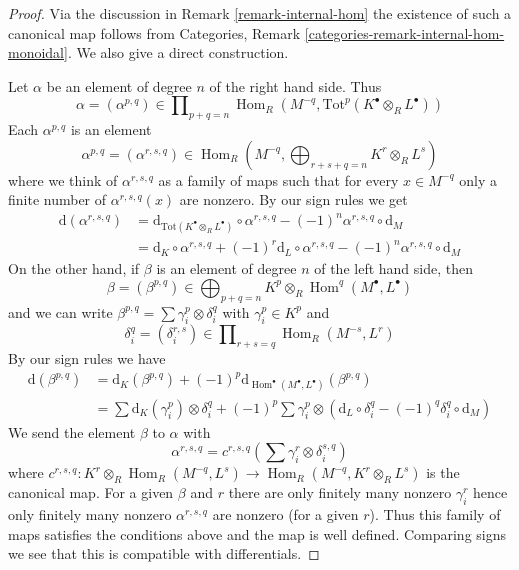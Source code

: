 \documentclass[10pt,a4paper]{amsart}
\theoremstyle{plain}
\theoremstyle{definition}
\theoremstyle{remark}
\numberwithin{equation}{subsection}
\def\Hom{\mathop{\mathrm{Hom}}\nolimits}
\begin{document}
\begin{proof}
Via the discussion in Remark \ref{remark-internal-hom} the existence
of such a canonical map follows from
Categories, Remark \ref{categories-remark-internal-hom-monoidal}.
We also give a direct construction.

\medskip\noindent
Let $\alpha$ be an element of degree $n$ of the right hand side.
Thus
$$
\alpha = (\alpha^{p, q}) \in \prod\nolimits_{p + q = n}
\Hom_R(M^{-q}, \text{Tot}^p(K^\bullet \otimes_R L^\bullet))
$$
Each $\alpha^{p, q}$ is an element
$$
\alpha^{p, q} = (\alpha^{r, s, q}) \in
\Hom_R(M^{-q}, \bigoplus\nolimits_{r + s + q = n} K^r \otimes_R L^s)
$$
where we think of $\alpha^{r, s, q}$ as a family of maps such that
for every $x \in M^{-q}$ only a finite number of
$\alpha^{r, s, q}(x)$ are nonzero. By our sign rules we get
\begin{align*}
\text{d}(\alpha^{r, s, q})
& =
\text{d}_{\text{Tot}(K^\bullet \otimes_R L^\bullet)} \circ \alpha^{r, s, q}
- (-1)^n \alpha^{r, s, q} \circ \text{d}_M \\
& =
\text{d}_K \circ \alpha^{r, s, q} + (-1)^r \text{d}_L \circ \alpha^{r, s, q}
- (-1)^n \alpha^{r, s, q} \circ \text{d}_M
\end{align*}
On the other hand, if $\beta$ is an element of degree $n$ of the
left hand side, then
$$
\beta = (\beta^{p, q}) \in
\bigoplus\nolimits_{p + q = n} K^p \otimes_R \Hom^q(M^\bullet, L^\bullet)
$$
and we can write $\beta^{p, q} = \sum \gamma_i^p \otimes \delta_i^q$ with
$\gamma_i^p \in K^p$ and
$$
\delta_i^q = (\delta_i^{r, s}) \in
\prod\nolimits_{r + s = q} \Hom_R(M^{-s}, L^r)
$$
By our sign rules we have
\begin{align*}
\text{d}(\beta^{p, q})
& =
\text{d}_K(\beta^{p, q}) +
(-1)^p \text{d}_{\Hom^\bullet(M^\bullet, L^\bullet)}(\beta^{p, q}) \\
& =
\sum \text{d}_K(\gamma_i^p) \otimes \delta_i^q +
(-1)^p \sum \gamma_i^p \otimes
(\text{d}_L \circ \delta_i^q - (-1)^q \delta_i^q \circ \text{d}_M)
\end{align*}
We send the element $\beta$ to $\alpha$ with
$$
\alpha^{r, s, q} = c^{r, s, q}(\sum \gamma_i^r \otimes \delta_i^{s, q})
$$
where $c^{r, s, q} : K^r \otimes_R \Hom_R(M^{-q}, L^s) \to
\Hom_R(M^{-q}, K^r \otimes_R L^s)$ is the canonical map.
For a given $\beta$ and $r$ there are only finitely many nonzero
$\gamma_i^r$ hence only finitely many nonzero $\alpha^{r, s, q}$
are nonzero (for a given $r$). Thus this family of maps satisfies
the conditions above and the map is well defined.
Comparing signs we see that this is compatible with differentials.
\end{proof}
\end{document}
